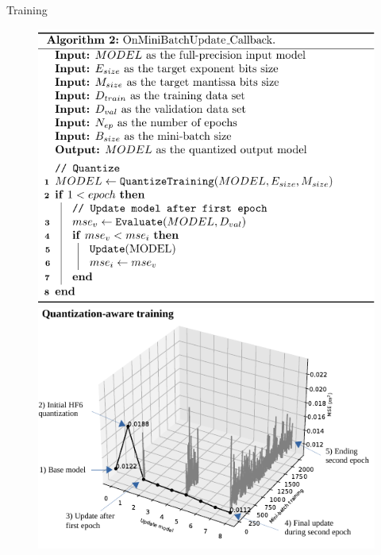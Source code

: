 \begin{frame}{Training}
\begin{figure}
		\begin{minipage}[c]{0.48\linewidth}
			\includegraphics[width=0.6\linewidth]{slides/OnMiniBatchUpdate_2.pdf} %
			\pause %
		\end{minipage}
		\hfill
		\begin{minipage}[c]{0.48\linewidth}
			\includegraphics[width=0.6\linewidth]{slides/figures/QAT.pdf} %
		\end{minipage}
	\end{figure}
\end{frame}
